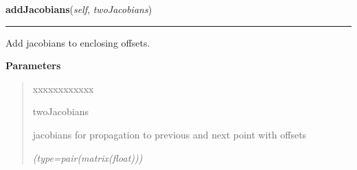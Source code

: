     \vspace{0.5ex}

\hspace{.8\funcindent}\begin{boxedminipage}{\funcwidth}

    \raggedright \textbf{addJacobians}(\textit{self}, \textit{twoJacobians})

    \vspace{-1.5ex}

    \rule{\textwidth}{0.5\fboxrule}
\setlength{\parskip}{2ex}
    Add jacobians to enclosing offsets.

\setlength{\parskip}{1ex}
      \textbf{Parameters}
      \vspace{-1ex}

      \begin{quote}
        \begin{Ventry}{xxxxxxxxxxxx}

          \item[twoJacobians]

          jacobians for propagation to previous and next point with offsets

            {\it (type=pair(matrix(float)))}

        \end{Ventry}

      \end{quote}

    \end{boxedminipage}

    \label{gblfit:GblPoint:getDerivatives}

    \vspace{0.5ex}

